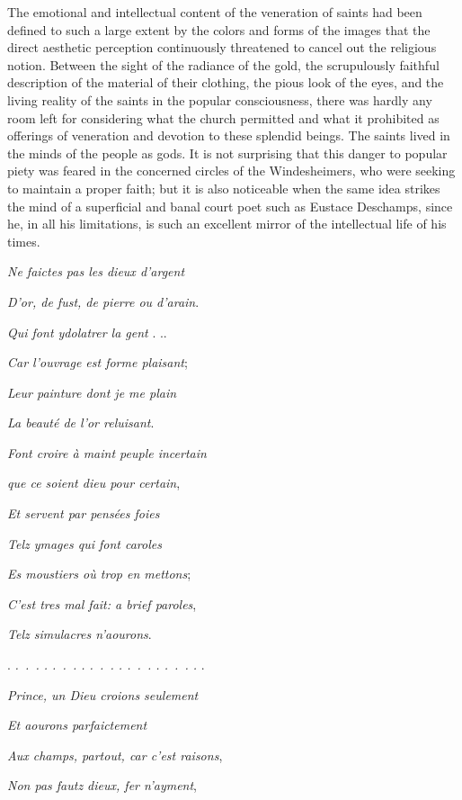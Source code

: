 The emotional and intellectual content of the veneration of saints had
been defined to such a large extent by the colors and forms of the
images that the direct aesthetic perception continuously threatened to
cancel out the religious notion. Between the sight of the radiance of
the gold, the scrupulously faithful description of the material of their
clothing, the pious look of the eyes, and the living reality of the
saints in the popular consciousness, there was hardly any room left for
considering what the church permitted and what it prohibited as
offerings of veneration and devotion to these splendid beings. The
saints lived in the minds of the people as gods. It is not surprising
that this danger to popular piety was feared in the concerned circles of
the Windesheimers, who were seeking to maintain a proper faith; but it
is also noticeable when the same idea strikes the mind of a superficial
and banal court poet such as Eustace Deschamps, since he, in all his
limitations, is such an excellent mirror of the intellectual life of his
times.

\emph{Ne faictes pas les dieux d'argent}

\emph{D'or, de fust, de pierre ou d'arain}.

\emph{Qui font ydolatrer la gent} . ..

\emph{Car l'ouvrage est forme plaisant};

\emph{Leur painture dont je me plain}

\emph{La beauté de l'or reluisant}.

\emph{\protect\hypertarget{13_Chapter_Six__THE_DEPICTION_OF_TH.xhtmlux5cux23page_201}{}{}Font
croire à maint peuple incertain}

\emph{que ce soient dieu pour certain},

\emph{Et servent par pensées foies}

\emph{Telz ymages qui font caroles}

\emph{Es moustiers où trop en mettons};

\emph{C'est tres mal fait: a brief paroles},

\emph{Telz simulacres n'aourons}.

. \emph{.~.~. . .~.~. . .~.~. . .~.~. . .~.~. .} .

\emph{Prince, un Dieu croions seulement}

\emph{Et aourons parfaictement}

\emph{Aux champs, partout, car c'est raisons},

\emph{Non pas fautz dieux, fer n'ayment},

